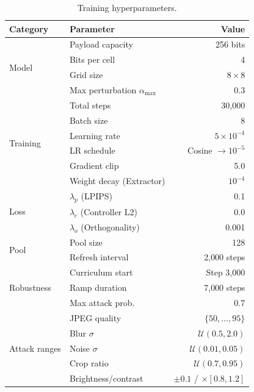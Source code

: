 \documentclass[conference]{IEEEtran}
\newcommand{\Ucal}{\mathcal{U}}
\begin{document}
\begin{table}[t]
\centering
\caption{Training hyperparameters.}
\label{tab:hyperparams}
\small
\begin{tabular}{@{}llr@{}}
\toprule
\textbf{Category} & \textbf{Parameter} & \textbf{Value} \\
\midrule
\multirow{4}{*}{Model}
    & Payload capacity & 256 bits \\
    & Bits per cell & 4 \\
    & Grid size & $8 \times 8$ \\
    & Max perturbation $\alpha_\text{max}$ & 0.3 \\
\midrule
\multirow{6}{*}{Training}
    & Total steps & 30{,}000 \\
    & Batch size & 8 \\
    & Learning rate & $5 \times 10^{-4}$ \\
    & LR schedule & Cosine $\to 10^{-5}$ \\
    & Gradient clip & 5.0 \\
    & Weight decay (Extractor) & $10^{-4}$ \\
\midrule
\multirow{3}{*}{Loss}
    & $\lambda_p$ (LPIPS) & 0.1 \\
    & $\lambda_c$ (Controller L2) & 0.0 \\
    & $\lambda_o$ (Orthogonality) & 0.001 \\
\midrule
\multirow{2}{*}{Pool}
    & Pool size & 128 \\
    & Refresh interval & 2{,}000 steps \\
\midrule
\multirow{3}{*}{Robustness}
    & Curriculum start & Step 3{,}000 \\
    & Ramp duration & 7{,}000 steps \\
    & Max attack prob. & 0.7 \\
\midrule
\multirow{5}{*}{Attack ranges}
    & JPEG quality & $\{50, \ldots, 95\}$ \\
    & Blur $\sigma$ & $\Ucal(0.5, 2.0)$ \\
    & Noise $\sigma$ & $\Ucal(0.01, 0.05)$ \\
    & Crop ratio & $\Ucal(0.7, 0.95)$ \\
    & Brightness/contrast & $\pm 0.1$ / $\times[0.8, 1.2]$ \\
\bottomrule
\end{tabular}
\end{table}
\end{document}
